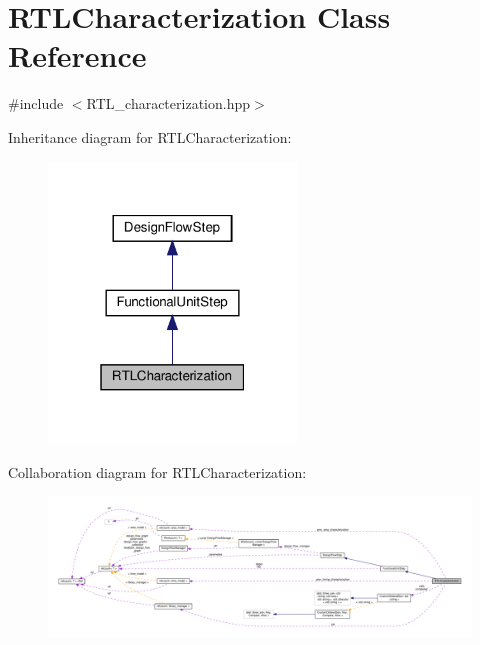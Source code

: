 \hypertarget{classRTLCharacterization}{}\section{R\+T\+L\+Characterization Class Reference}
\label{classRTLCharacterization}


{\ttfamily \#include $<$R\+T\+L\+\_\+characterization.\+hpp$>$}



Inheritance diagram for R\+T\+L\+Characterization\+:
\nopagebreak
\begin{figure}[H]
\begin{center}
\leavevmode
\includegraphics[width=187pt]{dc/d56/classRTLCharacterization__inherit__graph}
\end{center}
\end{figure}


Collaboration diagram for R\+T\+L\+Characterization\+:
\nopagebreak
\begin{figure}[H]
\begin{center}
\leavevmode
\includegraphics[width=350pt]{d8/da9/classRTLCharacterization__coll__graph}
\end{center}
\end{figure}
